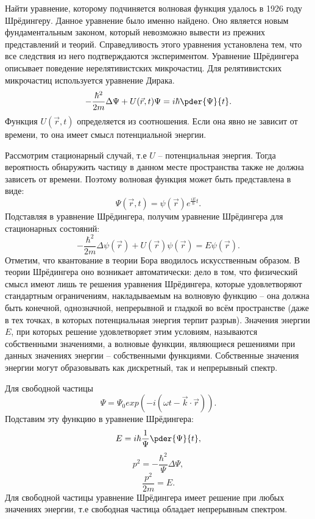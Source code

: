 
Найти уравнение, которому подчиняется волновая функция удалось в 1926 году
Шрёдингеру. Данное уравнение было именно найдено. Оно является новым
фундаментальным законом, который невозможно вывести из прежних представлений
и теорий. Справедливость этого уравнения установлена тем, что все следствия из
него подтверждаются экспериментом. Уравнение Шрёдингера описывает поведение
нерелятивистских микрочастиц. Для релятивистских микрочастиц используется
уравнение Дирака.
\[
    -\frac{\hbar^2}{2m}\Delta\Psi + U(\vec{r}, t)\Psi = i\hbar\pder{\Psi}{t}.
\]
Функция \( U(\vec{r}, t) \) определяется из соотношения. Если она явно не
зависит от времени, то она имеет смысл потенциальной энергии.

Рассмотрим стационарный случай, т.е \( U \) -- потенциальная энергия. Тогда
вероятность обнаружить частицу в данном месте пространства также не должна
зависеть от времени. Поэтому волновая функция может быть представлена в виде:
\[
    \Psi(\vec{r}, t) = \psi(\vec{r}) e^{\frac{iE}{\hbar}t}.
\]
Подставляя в уравнение Шрёдингера, получим уравнение Шрёдингера для стационарных
состояний:
\begin{equation}
    -\frac{\hbar^2}{2m}\Delta\psi(\vec{r}) + U(\vec{r})\psi(\vec{r}) =
    E\psi(\vec{r}).
\end{equation}
Отметим, что квантование в теории Бора вводилось искусственным образом. В теории
Шрёдингера оно возникает автоматически: дело в том, что физический смысл имеют
лишь те решения уравнения Шрёдингера, которые удовлетворяют стандартным
ограничениям, накладываемым на волновую функцию -- она должна быть конечной,
однозначной, непрерывной и гладкой во всём пространстве (даже в тех точках,
в которых потенциальная энергия терпит разрыв). Значения энергии \(E\),
при которых решение удовлетворяет этим условиям, называются собственными
значениями, а волновые функции, являющиеся решениями при данных значениях
энергии -- собственными функциями. Собственные значения энергии могут
образовывать как дискретный, так и непрерывный спектр.

Для свободной частицы
\[
    \Psi = \Psi_0 exp(-i(\omega t - \vec{k}\cdot\vec{r})).
\]
Подставим эту функцию в уравнение Шрёдингера:
\begin{equation}
     E = i\hbar\frac{1}{\Psi}\pder{\Psi}{t},
\end{equation} 
\begin{equation}
     p^2 = -\frac{\hbar^2}{\Psi}\Delta\Psi,
\end{equation}
\begin{equation}
     \frac{p^2}{2m} = E.
\end{equation}
Для свободной частицы уравнение Шрёдингера имеет решение при любых значениях
энергии, т.е свободная частица обладает непрерывным спектром.

